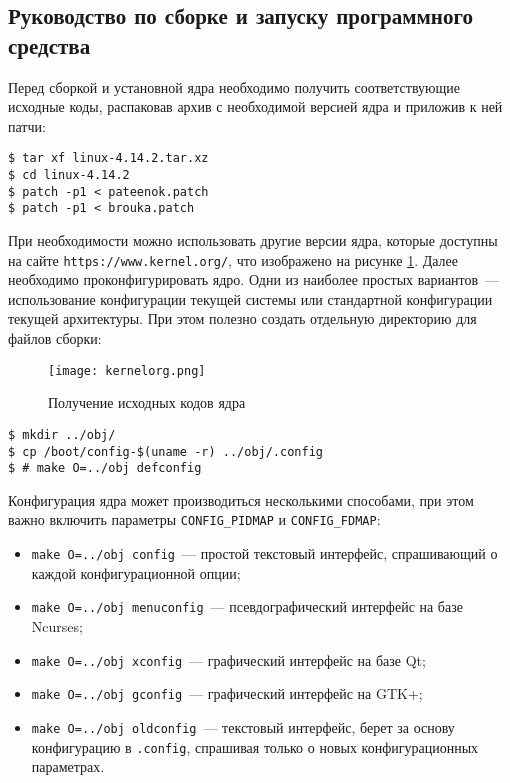 \subsection{Руководство по сборке и запуску программного средства}

Перед сборкой и установной ядра необходимо получить соответствующие исходные
коды, распаковав архив с необходимой версией ядра и приложив к ней патчи:

\medskip
\begin{lstlisting}[style=cstyle]
$ tar xf linux-4.14.2.tar.xz
$ cd linux-4.14.2
$ patch -p1 < pateenok.patch
$ patch -p1 < brouka.patch
\end{lstlisting}
\medskip

При необходимости можно использовать другие версии ядра, которые доступны на
сайте \texttt{https://www.kernel.org/}, что изображено на рисунке
\ref{fig:kernelorg}. Далее необходимо проконфигурировать
ядро. Одни из наиболее простых вариантов~--- использование конфигурации текущей
системы или стандартной конфигурации текущей архитектуры. При этом полезно
создать отдельную директорию для файлов сборки:

\begin{figure}
  \centering
  \texttt{[image: kernelorg.png]}
  \caption{Получение исходных кодов ядра}
  \label{fig:kernelorg}
\end{figure}

\medskip
\begin{lstlisting}[style=cstyle]
$ mkdir ../obj/
$ cp /boot/config-$(uname -r) ../obj/.config
$ # make O=../obj defconfig
\end{lstlisting}
\medskip

Конфигурация ядра может производиться несколькими способами, при этом важно
включить параметры \texttt{CONFIG\_PIDMAP} и \texttt{CONFIG\_FDMAP}:
\begin{itemize}
\item \texttt{make O=../obj config}~--- простой текстовый интерфейс,
  спрашивающий о каждой конфигурационной опции;
\item \texttt{make O=../obj menuconfig}~--- псевдографический интерфейс на базе
  Ncurses;
\item \texttt{make O=../obj xconfig}~--- графический интерфейс на базе Qt;
\item \texttt{make O=../obj gconfig}~--- графический интерфейс на GTK+;
\item \texttt{make O=../obj oldconfig}~--- текстовый интерфейс, берет за основу
  конфигурацию в \texttt{.config}, спрашивая только о новых конфигурационных
  параметрах.
\end{itemize}

